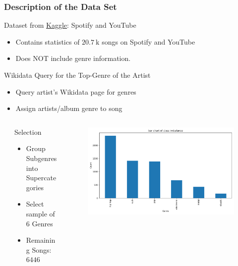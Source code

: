 \documentclass[8pt]{beamer}
\begin{document}
\begin{frame}
  \frametitle{Description of the Data Set}
    \begin{alertblock}{Dataset from \href{https://www.kaggle.com/datasets/salvatorerastelli/spotify-and-youtube}{Kaggle}: Spotify and YouTube}
      \begin{itemize}
        \item Contains statistics of $\SI{20.7}{\kilo}$ songs on Spotify and YouTube
        \item Does \alert{NOT} include genre information.
      \end{itemize}
    \end{alertblock}
    \begin{alertblock}{Wikidata Query for the Top-Genre of the Artist}
      \begin{itemize}
       \item Query artist’s Wikidata page for genres
       \item Assign artists/album genre to song
      \end{itemize}
    \end{alertblock}
    \vspace*{-0.5cm}
    \begin{columns}[t]
        \begin{column}{0.1\textwidth}
        \end{column}
        \begin{column}{0.3\textwidth}
            \begin{alertblock}{Selection}
                \begin{itemize}
                    \item Group Subgenres into Supercategories
                    \item Select sample of $\num{6}$ Genres
                    \item Remaining Songs: $\num{6446}$
                \end{itemize}
            \end{alertblock}
        \end{column}
        \begin{column}{0.7\textwidth}
            \begin{figure}
                \includegraphics[width=\textwidth]{figures/genre_hist.pdf}

\end{figure}
\end{column}
\end{columns}
\end{frame}
\end{document}
